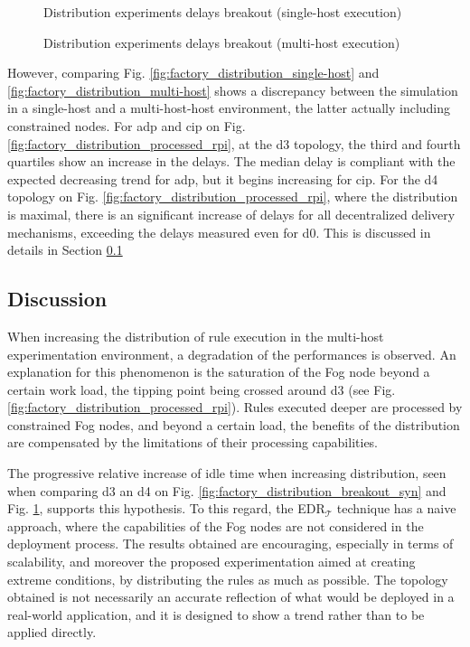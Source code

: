 \documentclass{iosart2c}
\newcommand{\edrt}{EDR$_{\mathcal{T}}$\xspace}
\begin{document}
\begin{figure}
	\Centering
	\caption{Distribution experiments delays breakout (single-host execution)}
	\label{fig:factory_distribution_breakout_syn}
	\scalebox{0.78}{
		
	}
	\caption{Distribution experiments delays breakout (multi-host execution)}
	\label{fig:factory_distribution_breakout_rpi}
	\scalebox{0.78}{
		
	}
\end{figure}

However, comparing Fig. \ref{fig:factory_distribution_single-host} and \ref{fig:factory_distribution_multi-host} shows a discrepancy between the simulation in a single-host and a multi-host-host environment, the latter actually including constrained nodes.
For \gls{adp} and \gls{cip} on Fig. \ref{fig:factory_distribution_processed_rpi}, at the d3 topology, the third and fourth quartiles show an increase in the delays.
The median delay is compliant with the expected decreasing trend for \gls{adp}, but it begins increasing for \gls{cip}.
For the d4 topology on Fig. \ref{fig:factory_distribution_processed_rpi}, where the distribution is maximal, there is an significant increase of delays for all decentralized delivery mechanisms, exceeding the delays measured even for d0.
This is discussed in details in Section \textsection \ref{subs:discussion}

\subsection{Discussion}
\label{subs:discussion}

When increasing the distribution of rule execution in the multi-host experimentation environment, a degradation of the performances is observed.
An explanation for this phenomenon is the saturation of the Fog node beyond a certain work load, the tipping point being crossed around d3 (see Fig. \ref{fig:factory_distribution_processed_rpi}). 
Rules executed deeper are processed by constrained Fog nodes, and beyond a certain load, the benefits of the distribution are compensated by the limitations of their processing capabilities.

The progressive relative increase of idle time when increasing distribution, seen when comparing d3 an d4 on Fig. \ref{fig:factory_distribution_breakout_syn} and Fig. \ref{fig:factory_distribution_breakout_rpi}, supports this hypothesis.
To this regard, the \edrt technique has a naive approach, where the capabilities of the Fog nodes are not considered in the deployment process.
The results obtained are encouraging, especially in terms of scalability, and moreover the proposed experimentation aimed at creating extreme conditions, by distributing the rules as much as possible.
The topology obtained is not necessarily an accurate reflection of what would be deployed in a real-world application, and it is designed to show a trend rather than to be applied directly.
\end{document}
